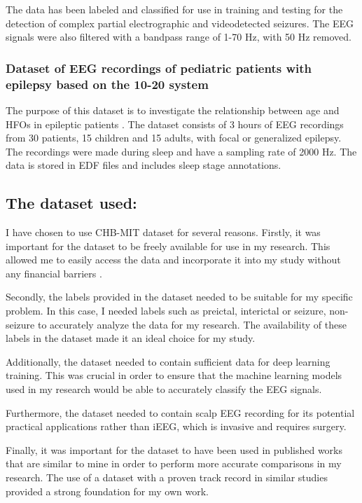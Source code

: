 The data has been labeled and classified for use in training and testing for the detection of complex partial electrographic and videodetected seizures. The \gls{EEG} signals were also filtered with a bandpass range of 1-70 Hz, with 50 Hz removed.


\subsubsection{Dataset of EEG recordings of pediatric patients with epilepsy based on the 10-20 system}
The purpose of this dataset is to investigate the relationship between age and \glspl{HFO} in epileptic patients \cite{cserpan_dataset_2021}. The dataset consists of 3 hours of \gls{EEG} recordings from 30 patients, 15 children and 15 adults, with focal or generalized epilepsy. The recordings were made during sleep and have a sampling rate of 2000 Hz. The data is stored in \gls{EDF} files and includes sleep stage annotations.

\subsection{The dataset used: } \label{subsec:dataset-used}
I have chosen to use \gls{CHB-MIT} dataset for several reasons. Firstly, it was important for the dataset to be freely available for use in my research. This allowed me to easily access the data and incorporate it into my study without any financial barriers \cite{shoeb_application_2009, shoeb_chb-mit_2010}.

Secondly, the labels provided in the dataset needed to be suitable for my specific problem. In this case, I needed labels such as preictal, interictal or seizure, non-seizure to accurately analyze the data for my research. The availability of these labels in the dataset made it an ideal choice for my study.

Additionally, the dataset needed to contain sufficient data for deep learning training. This was crucial in order to ensure that the machine learning models used in my research would be able to accurately classify the \gls{EEG} signals.

Furthermore, the dataset needed to contain scalp EEG recording for its potential practical applications rather than \gls{iEEG}, which is invasive and requires surgery.

Finally, it was important for the dataset to have been used in published works that are similar to mine in order to perform more accurate comparisons in my research. The use of a dataset with a proven track record in similar studies provided a strong foundation for my own work.

